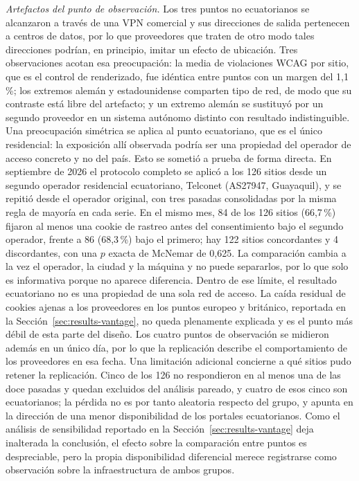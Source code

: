 \documentclass[pdflatex,sn-basic,Numbered,iicol]{sn-jnl}
\theoremstyle{thmstyleone}
\theoremstyle{thmstyletwo}
\theoremstyle{thmstylethree}
\begin{document}
\emph{Artefactos del punto de observaci\'on.} Los tres puntos no ecuatorianos se alcanzaron a trav\'es de una VPN comercial y sus direcciones de salida pertenecen a centros de datos, por lo que proveedores que traten de otro modo tales direcciones podr\'ian, en principio, imitar un efecto de ubicaci\'on. Tres observaciones acotan esa preocupaci\'on: la media de violaciones WCAG por sitio, que es el control de renderizado, fue id\'entica entre puntos con un margen del 1,1\,\%; los extremos alem\'an y estadounidense comparten tipo de red, de modo que su contraste est\'a libre del artefacto; y un extremo alem\'an se sustituy\'o por un segundo proveedor en un sistema aut\'onomo distinto con resultado indistinguible. Una preocupaci\'on sim\'etrica se aplica al punto ecuatoriano, que es el \'unico residencial: la exposici\'on all\'i observada podr\'ia ser una propiedad del operador de acceso concreto y no del pa\'is. Esto se someti\'o a prueba de forma directa. En septiembre de 2026 el protocolo completo se aplic\'o a los 126 sitios desde un segundo operador residencial ecuatoriano, Telconet (AS27947, Guayaquil), y se repiti\'o desde el operador original, con tres pasadas consolidadas por la misma regla de mayor\'ia en cada serie. En el mismo mes, 84 de los 126 sitios (66,7\,\%) fijaron al menos una cookie de rastreo antes del consentimiento bajo el segundo operador, frente a 86 (68,3\,\%) bajo el primero; hay 122 sitios concordantes y 4 discordantes, con una $p$ exacta de McNemar de 0,625. La comparaci\'on cambia a la vez el operador, la ciudad y la m\'aquina y no puede separarlos, por lo que solo es informativa porque no aparece diferencia. Dentro de ese l\'imite, el resultado ecuatoriano no es una propiedad de una sola red de acceso. La ca\'ida residual de cookies ajenas a los proveedores en los puntos europeo y brit\'anico, reportada en la Secci\'on~\ref{sec:results-vantage}, no queda plenamente explicada y es el punto m\'as d\'ebil de esta parte del dise\~no. Los cuatro puntos de observaci\'on se midieron adem\'as en un \'unico d\'ia, por lo que la replicaci\'on describe el comportamiento de los proveedores en esa fecha. Una limitaci\'on adicional concierne a qu\'e sitios pudo retener la replicaci\'on. Cinco de los 126 no respondieron en al menos una de las doce pasadas y quedan excluidos del an\'alisis pareado, y cuatro de esos cinco son ecuatorianos; la p\'erdida no es por tanto aleatoria respecto del grupo, y apunta en la direcci\'on de una menor disponibilidad de los portales ecuatorianos. Como el an\'alisis de sensibilidad reportado en la Secci\'on~\ref{sec:results-vantage} deja inalterada la conclusi\'on, el efecto sobre la comparaci\'on entre puntos es despreciable, pero la propia disponibilidad diferencial merece registrarse como observaci\'on sobre la infraestructura de ambos grupos.
\end{document}
